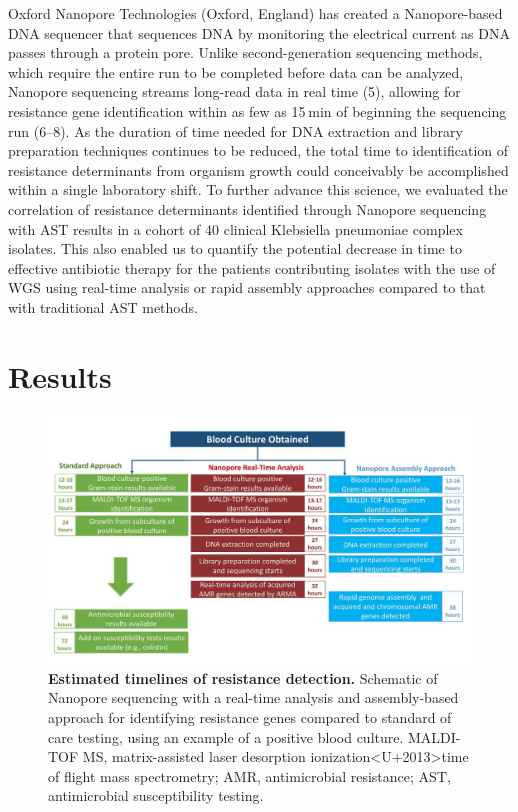 Oxford Nanopore Technologies (Oxford, England) has created a Nanopore-based DNA sequencer that sequences DNA by monitoring the electrical current as DNA passes through a protein pore. Unlike second-generation sequencing methods, which require the entire run to be completed before data can be analyzed, Nanopore sequencing streams long-read data in real time (5), allowing for resistance gene identification within as few as 15 min of beginning the sequencing run (6–8). As the duration of time needed for DNA extraction and library preparation techniques continues to be reduced, the total time to identification of resistance determinants from organism growth could conceivably be accomplished within a single laboratory shift. To further advance this science, we evaluated the correlation of resistance determinants identified through Nanopore sequencing with AST results in a cohort of 40 clinical Klebsiella pneumoniae complex isolates. This also enabled us to quantify the potential decrease in time to effective antibiotic therapy for the patients contributing isolates with the use of WGS using real-time analysis or rapid assembly approaches compared to that with traditional AST methods.


\section{Results}
\label{sec:results}




\begin{figure}[!hb]
\centering
\includegraphics[width = 1\linewidth,keepaspectratio]{figure/timeline.pdf}
\caption[Estimated timelines of resistance detection]{{\bf Estimated timelines of resistance detection.} Schematic of Nanopore sequencing with a real-time analysis and assembly-based approach for identifying resistance genes compared to standard of care testing, using an example of a positive blood culture. MALDI-TOF MS, matrix-assisted laser desorption ionization<U+2013>time of flight mass spectrometry; AMR, antimicrobial resistance; AST, antimicrobial susceptibility testing. }
\label{fig:asms}
\end{figure}


